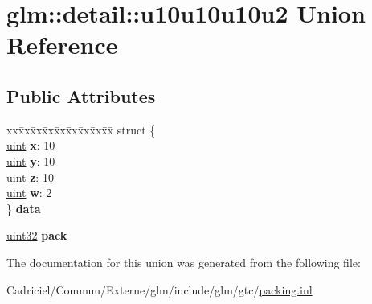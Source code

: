 \hypertarget{unionglm_1_1detail_1_1u10u10u10u2}{}\section{glm\+:\+:detail\+:\+:u10u10u10u2 Union Reference}
\label{unionglm_1_1detail_1_1u10u10u10u2}
\subsection*{Public Attributes}
\begin{DoxyCompactItemize}
\item 
\begin{tabbing}
xx\=xx\=xx\=xx\=xx\=xx\=xx\=xx\=xx\=\kill
struct \{\\
\>\hyperlink{group__core__precision_ga4fd29415871152bfb5abd588334147c8}{uint} {\bfseries x}: 10\\
\>\hyperlink{group__core__precision_ga4fd29415871152bfb5abd588334147c8}{uint} {\bfseries y}: 10\\
\>\hyperlink{group__core__precision_ga4fd29415871152bfb5abd588334147c8}{uint} {\bfseries z}: 10\\
\>\hyperlink{group__core__precision_ga4fd29415871152bfb5abd588334147c8}{uint} {\bfseries w}: 2\\
\} {\bfseries data}\hypertarget{unionglm_1_1detail_1_1u10u10u10u2_a2b1c07bb6d4d674dade5bd7c1e91c791}{}\label{unionglm_1_1detail_1_1u10u10u10u2_a2b1c07bb6d4d674dade5bd7c1e91c791}
\\

\end{tabbing}\item 
\hyperlink{group__gtc__type__precision_ga202b6a53c105fcb7e531f9b443518451}{uint32} {\bfseries pack}\hypertarget{unionglm_1_1detail_1_1u10u10u10u2_a8bb9d7804af09ba3790a4b5622321511}{}\label{unionglm_1_1detail_1_1u10u10u10u2_a8bb9d7804af09ba3790a4b5622321511}

\end{DoxyCompactItemize}


The documentation for this union was generated from the following file\+:\begin{DoxyCompactItemize}
\item 
Cadriciel/\+Commun/\+Externe/glm/include/glm/gtc/\hyperlink{packing_8inl}{packing.\+inl}\end{DoxyCompactItemize}
